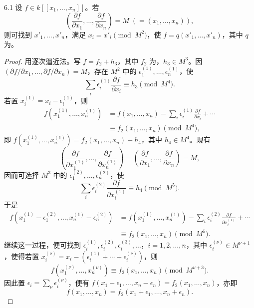 \begin{SGAresult}{}{6.1}
设 $f\in k[[x_1,\ldots,x_n]]$。若
\[
\left(\frac{\partial f}{\partial x_1},\ldots,\frac{\partial f}{\partial x_n}\right)
 =M\;(=(x_1,\ldots,x_n)),
\]
则可找到 $x'_1,\ldots,x'_n$，满足 $x_i=x'_i\pmod{M^2}$，使 $f=q(x'_1,\ldots,x'_n)$，其中 $q$ 为。
\end{SGAresult}
\begin{proof}
用逐次逼近法。写 $f=f_2+h_3$，其中 $f_2$ 为，$h_3\in M^3$。因 $(\partial f/\partial x_1,\ldots,\partial f/\partial x_n)=M$，存在 $M^2$ 中的 $\epsilon_1^{(1)},\ldots,\epsilon_n^{(1)}$，使
\[
\sum_i\epsilon_i^{(1)}\frac{\partial f}{\partial x_i}\equiv h_3\pmod{M^4}.
\]
若置 $x_i^{(1)}=x_i-\epsilon_i^{(1)}$，则
\[
\begin{aligned}
f(x_1^{(1)},\ldots,x_n^{(1)})
 &=f(x_1,\ldots,x_n)-\sum_i\epsilon_i^{(1)}\frac{\partial f}{\partial x_i}+\cdots\\
 &\equiv f_2(x_1,\ldots,x_n)\pmod{M^4},
\end{aligned}
\]
即 $f(x_1^{(1)},\ldots,x_n^{(1)})=f_2(x_1,\ldots,x_n)+h_4$，其中 $h_4\in M^4$。现有
\[
\left(\frac{\partial f}{\partial x_1^{(1)}},\ldots,\frac{\partial f}{\partial x_n^{(1)}}\right)
 =\left(\frac{\partial f}{\partial x_1},\ldots,\frac{\partial f}{\partial x_n}\right)=M,
\]
因而可选择
$M^3$ 中的 $\epsilon_1^{(2)},\ldots,\epsilon_n^{(2)}$，使
\[
\sum_i\epsilon_i^{(2)}\frac{\partial f}{\partial x_i^{(1)}}\equiv h_4\pmod{M^5}.
\]
于是
\[
\begin{aligned}
f(x_1^{(1)}-\epsilon_1^{(2)},\ldots,x_n^{(1)}-\epsilon_n^{(2)})
 &=f(x_1^{(1)},\ldots,x_n^{(1)})-\sum_i\epsilon_i^{(2)}\frac{\partial f}{\partial x_i^{(1)}}+\cdots\\
 &\equiv f_2(x_1,\ldots,x_n)\pmod{M^5}.
\end{aligned}
\]
继续这一过程，便可找到 $\epsilon_i^{(1)},\epsilon_i^{(2)},\epsilon_i^{(3)},\ldots$，$i=1,2,\ldots,n$，其中 $\epsilon_i^{(\nu)}\in M^{\nu+1}$，使得若置 $x_i^{(\nu)}=x_i-(\epsilon_i^{(1)}+\cdots+\epsilon_i^{(\nu)})$，则
\[
f(x_1^{(\nu)},\ldots,x_n^{(\nu)})\equiv f_2(x_1,\ldots,x_n)\pmod{M^{\nu+3}}.
\]
因此置 $\epsilon_i=\sum_\nu\epsilon_i^{(\nu)}$，便有 $f(x_1-\epsilon_1,\ldots,x_n-\epsilon_n)=f_2(x_1,\ldots,x_n)$，亦即
\[
f(x_1,\ldots,x_n)=f_2(x_1+\epsilon_1,\ldots,x_n+\epsilon_n).
\]
\end{proof}

